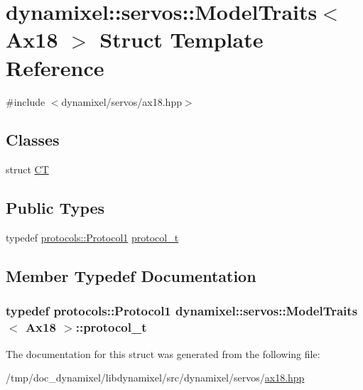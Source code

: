 \hypertarget{structdynamixel_1_1servos_1_1_model_traits_3_01_ax18_01_4}{}\section{dynamixel\+:\+:servos\+:\+:Model\+Traits$<$ Ax18 $>$ Struct Template Reference}
\label{structdynamixel_1_1servos_1_1_model_traits_3_01_ax18_01_4}


{\ttfamily \#include $<$dynamixel/servos/ax18.\+hpp$>$}

\subsection*{Classes}
\begin{DoxyCompactItemize}
\item 
struct \hyperlink{structdynamixel_1_1servos_1_1_model_traits_3_01_ax18_01_4_1_1_c_t}{C\+T}
\end{DoxyCompactItemize}
\subsection*{Public Types}
\begin{DoxyCompactItemize}
\item 
typedef \hyperlink{classdynamixel_1_1protocols_1_1_protocol1}{protocols\+::\+Protocol1} \hyperlink{structdynamixel_1_1servos_1_1_model_traits_3_01_ax18_01_4_a8ec1fab68931cfb87a497e39f2b2458a}{protocol\+\_\+t}
\end{DoxyCompactItemize}


\subsection{Member Typedef Documentation}
\hypertarget{structdynamixel_1_1servos_1_1_model_traits_3_01_ax18_01_4_a8ec1fab68931cfb87a497e39f2b2458a}{}
\subsubsection[{protocol\+\_\+t}]{\setlength{\rightskip}{0pt plus 5cm}typedef {\bf protocols\+::\+Protocol1} {\bf dynamixel\+::servos\+::\+Model\+Traits}$<$ {\bf Ax18} $>$\+::{\bf protocol\+\_\+t}}\label{structdynamixel_1_1servos_1_1_model_traits_3_01_ax18_01_4_a8ec1fab68931cfb87a497e39f2b2458a}


The documentation for this struct was generated from the following file\+:\begin{DoxyCompactItemize}
\item 
/tmp/doc\+\_\+dynamixel/libdynamixel/src/dynamixel/servos/\hyperlink{ax18_8hpp}{ax18.\+hpp}\end{DoxyCompactItemize}

